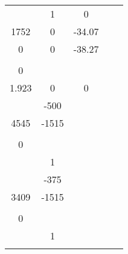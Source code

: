 \documentclass[runningheads,a4paper]{llncs}
\begin{document}
\begin{table}[htb]
\begin{tabular}{|c|c|c|c|c|}
\begin{array}{ccc}
0		& 1 		& 0		\\
1752	& 0			& -34.07\\
0		& 0			& -38.27\\
\end{array}\right]$ & $\left[\begin{array}{c}
0 \\ 0 \\ 1.923
\end{array}\right]$ & $\left[\begin{array}{ccc}
1 & 0 & 0\\
\end{array}\right]$ & 0 \\ \hline
\begin{tabular}[c]{@{}c@{}}Buck\\ Converter\end{tabular}                      & $\left[\begin{array}{cc}
0		& -500 \\
4545	& -1515\\
\end{array}\right]$ & $\left[\begin{array}{c}
125 \\ 0 \\
\end{array}\right]$ & $\left[\begin{array}{cc}
 0 & 1\\
\end{array}\right]$ & 0 \\ \hline
\begin{tabular}[c]{@{}c@{}}Boost\\ Converter\end{tabular} & $\left[\begin{array}{cc}
0		& -375 \\
3409	& -1515\\
\end{array}\right]$ & $\left[\begin{array}{c}
500 \\ 0 \\
\end{array}\right]$ &  $\left[\begin{array}{cc}
0 & 1\\
\end{array}\right]$  & 0        \\ \hline
\begin{tabular}[c]{@{}c@{}}Buck-boost\\ Converter\end{tabular} & $\left[\begin{array}{cc}

\end{array}
\end{tabular}
\end{table}
\end{document}
